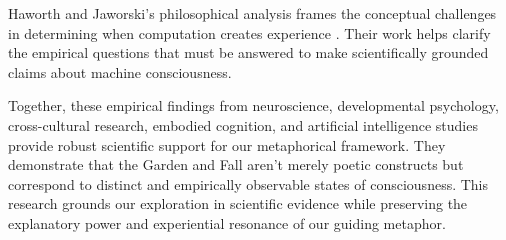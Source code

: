 Haworth and Jaworski's philosophical analysis frames the conceptual challenges in determining when computation creates experience \parencite{haworth2025when}. Their work helps clarify the empirical questions that must be answered to make scientifically grounded claims about machine consciousness.

Together, these empirical findings from neuroscience, developmental psychology, cross-cultural research, embodied cognition, and artificial intelligence studies provide robust scientific support for our metaphorical framework. They demonstrate that the Garden and Fall aren't merely poetic constructs but correspond to distinct and empirically observable states of consciousness. This research grounds our exploration in scientific evidence while preserving the explanatory power and experiential resonance of our guiding metaphor.
